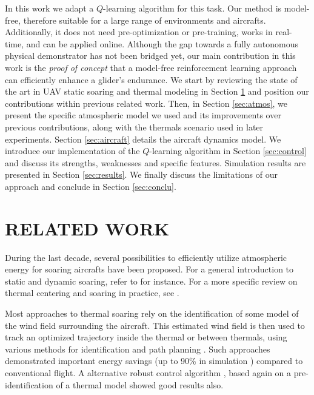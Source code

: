 \documentclass{jfpda}
\begin{document}
In this work we adapt a $Q$-learning \cite{watkins92qlearning} algorithm for this task. Our method is model-free, therefore suitable for a large range of environments and aircrafts. Additionally, it does not need pre-optimization or pre-training, works in real-time, and can be applied online. Although the gap towards a fully autonomous physical demonstrator has not been bridged yet, our main contribution in this work is the \emph{proof of concept} that a model-free reinforcement learning approach can efficiently enhance a glider's endurance.
We start by reviewing the state of the art in UAV static soaring and thermal modeling in Section \ref{sec:relwork} and position our contributions within previous related work. Then, in Section \ref{sec:atmos}, we present the specific atmospheric model we used and its improvements over previous contributions, along with the thermals scenario used in later experiments. Section \ref{sec:aircraft} details the aircraft dynamics model. We introduce our implementation of the $Q$-learning algorithm in Section \ref{sec:control} and discuss its strengths, weaknesses and specific features. Simulation results are presented in Section \ref{sec:results}. We finally discuss the limitations of our approach and conclude in Section \ref{sec:conclu}.

\section{RELATED WORK}
\label{sec:relwork}

During the last decade, several possibilities to efficiently utilize atmospheric energy for soaring aircrafts have been proposed. For a general introduction to static and dynamic soaring, refer to \cite{chen1981} for instance. For a more specific review on thermal centering and soaring in practice, see \cite{reichmann}.

Most approaches to thermal soaring rely on the identification of some model of the wind field surrounding the aircraft. This estimated wind field is then used to track an optimized trajectory inside the thermal or between thermals, using various methods for identification and path planning \cite{allen05,allen07,lawrance11,lawrance_phd,bencatel13,chen11,chakrabarty}. Such approaches demonstrated important energy savings (up to 90\% in simulation \cite{chakrabarty}) compared to conventional flight. A alternative robust control algorithm \cite{kahveci}, based again on a pre-identification of a thermal model showed good results also.
\end{document}
